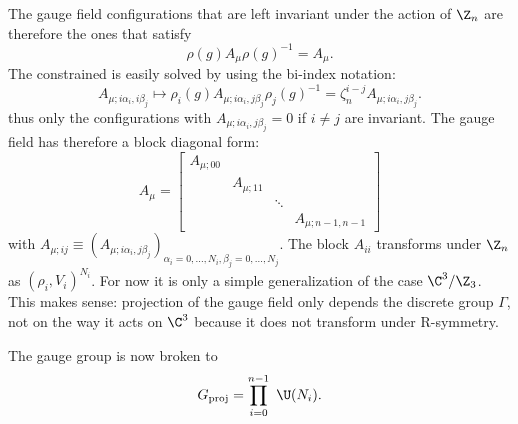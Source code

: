 \documentclass{worksheetclass}
\begin{document}
        The gauge field configurations that are left invariant under the action of $\Z_n$ are therefore the ones that satisfy
        \begin{equation}
            \rho(g)A_\mu\rho(g)^{-1}=A_\mu.
        \end{equation}
        The constrained is easily solved by using the bi-index notation:
        \begin{equation}
            A_{\mu;i\alpha_i,i\beta_j}\mapsto \rho_i(g)A_{\mu;i\alpha_i,j\beta_j}\rho_j(g)^{-1}=\zeta^{i-j}_nA_{\mu;i\alpha_i,j\beta_j}.
        \end{equation}
        thus only the configurations with $A_{\mu;i\alpha_i,j\beta_j}=0$ if $i\neq j$ are invariant. The gauge field has therefore a block diagonal form:
        \begin{equation}
            A_\mu=
            \begin{bmatrix}
                A_{\mu;00} & & & \\
                & A_{\mu;11} & & \\
                & & \ddots & \\
                & & & A_{\mu;n-1,n-1}
            \end{bmatrix}
        \end{equation}
        with $A_{\mu;ij}\equiv (A_{\mu;i\alpha_i,j\beta_j})_{\alpha_i=0,\dots,N_i,\beta_j=0,\dots,N_j}$. The block $A_{ii}$ transforms under $\Z_n$ as $(\rho_i,V_i)^{N_i}$. For now it is only a simple generalization of the case $\C^3/\Z_3$. This makes sense: projection of the gauge field only depends the discrete group $\Gamma$, not on the way it acts on $\C^3$ because it does not transform under R-symmetry.
        
        The gauge group is now broken to
        \begin{equation}
            G_{\text{proj}}=\prod^{n-1}_{i=0}~\U(N_i).
        \end{equation}
\end{document}
